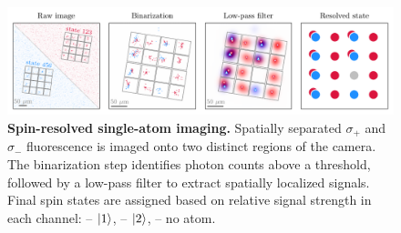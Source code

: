 
\begin{figure}
    \centering
    \includegraphics{fig-py/imaging-spin-resolved.pdf}
    \caption[Spin-resolved single-atom imaging]{
        \textbf{Spin-resolved single-atom imaging.}
        Spatially separated $\sigma_+$ and $\sigma_-$ fluorescence is imaged onto two distinct regions of the camera. The binarization step identifies photon counts above a threshold, followed by a low-pass filter to extract spatially localized signals. Final spin states are assigned based on relative signal strength in each channel:
        \raisebox{-1pt}{\scalebox{1.5}{\textcolor{ublue}{\textbullet}}} -- $\left| 1 \right\rangle$, 
        \raisebox{-1pt}{\scalebox{1.5}{\textcolor{ured}{\textbullet}}} -- $\left| 2 \right\rangle$, 
        \raisebox{-1pt}{\scalebox{1.5}{\textcolor{uhole}{\textbullet}}} -- no atom.
    }
    \label{fig:spin-resolved}
\end{figure}




